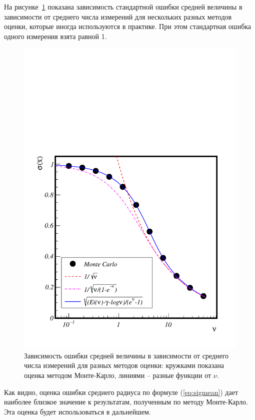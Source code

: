 \documentclass[12pt]{article}
\begin{document}
На рисунке~\ref{fig:sigmean} показана зависимость стандартной ошибки средней величины в зависимости от среднего числа измерений для нескольких разных
методов оценки, которые иногда используются в практике. При этом стандартная ошибка одного измерения взята равной 1.
\begin{figure}[htbp]
\begin{center}
\includegraphics[width=0.6\textheight]{sigmean.pdf}
\caption{\small Зависимость ошибки средней величины в зависимости от среднего числа измерений для разных методов оценки: кружками показана оценка 
методом Монте-Карло, линиями -- разные функции от $\nu$.}
\label{fig:sigmean}
\end{center}
\end{figure}

Как видно, оценка ошибки среднего радиуса по формуле (\ref{eq:sigmean}) дает наиболее близкое значение к результатам, полученным по методу Монте-Карло. 
Эта оценка будет использоваться в дальнейшем.
\end{document}
